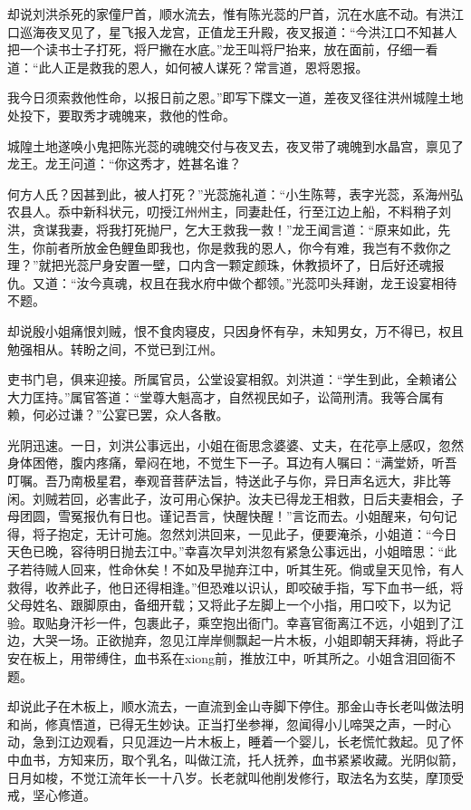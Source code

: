 \documentclass[12pt,UTF8]{ctexbook}
\begin{document}
{	却说刘洪杀死的家僮尸首，顺水流去，惟有陈光蕊的尸首，沉在水底不动。有洪江口巡海夜叉见了，星飞报入龙宫，正值龙王升殿，夜叉报道：“今洪江口不知甚人把一个读书士子打死，将尸撇在水底。”龙王叫将尸抬来，放在面前，仔细一看道：“此人正是救我的恩人，如何被人谋死？常言道，恩将恩报。
	
	我今日须索救他性命，以报日前之恩。”即写下牒文一道，差夜叉径往洪州城隍土地处投下，要取秀才魂魄来，救他的性命。
	
	城隍土地遂唤小鬼把陈光蕊的魂魄交付与夜叉去，夜叉带了魂魄到水晶宫，禀见了龙王。龙王问道：“你这秀才，姓甚名谁？
	
	何方人氏？因甚到此，被人打死？”光蕊施礼道：“小生陈萼，表字光蕊，系海州弘农县人。忝中新科状元，叨授江州州主，同妻赴任，行至江边上船，不料稍子刘洪，贪谋我妻，将我打死抛尸，乞大王救我一救！”龙王闻言道：“原来如此，先生，你前者所放金色鲤鱼即我也，你是救我的恩人，你今有难，我岂有不救你之理？”就把光蕊尸身安置一壁，口内含一颗定颜珠，休教损坏了，日后好还魂报仇。又道：“汝今真魂，权且在我水府中做个都领。”光蕊叩头拜谢，龙王设宴相待不题。
	
	却说殷小姐痛恨刘贼，恨不食肉寝皮，只因身怀有孕，未知男女，万不得已，权且勉强相从。转盼之间，不觉已到江州。
	
	吏书门皂，俱来迎接。所属官员，公堂设宴相叙。刘洪道：“学生到此，全赖诸公大力匡持。”属官答道：“堂尊大魁高才，自然视民如子，讼简刑清。我等合属有赖，何必过谦？”公宴已罢，众人各散。
	
	光阴迅速。一日，刘洪公事远出，小姐在衙思念婆婆、丈夫，在花亭上感叹，忽然身体困倦，腹内疼痛，晕闷在地，不觉生下一子。耳边有人嘱曰：“满堂娇，听吾叮嘱。吾乃南极星君，奉观音菩萨法旨，特送此子与你，异日声名远大，非比等闲。刘贼若回，必害此子，汝可用心保护。汝夫已得龙王相救，日后夫妻相会，子母团圆，雪冤报仇有日也。谨记吾言，快醒快醒！”言讫而去。小姐醒来，句句记得，将子抱定，无计可施。忽然刘洪回来，一见此子，便要淹杀，小姐道：“今日天色已晚，容待明日抛去江中。”幸喜次早刘洪忽有紧急公事远出，小姐暗思：“此子若待贼人回来，性命休矣！不如及早抛弃江中，听其生死。倘或皇天见怜，有人救得，收养此子，他日还得相逢。”但恐难以识认，即咬破手指，写下血书一纸，将父母姓名、跟脚原由，备细开载；又将此子左脚上一个小指，用口咬下，以为记验。取贴身汗衫一件，包裹此子，乘空抱出衙门。幸喜官衙离江不远，小姐到了江边，大哭一场。正欲抛弃，忽见江岸岸侧飘起一片木板，小姐即朝天拜祷，将此子安在板上，用带缚住，血书系在xiong前，推放江中，听其所之。小姐含泪回衙不题。
	
	却说此子在木板上，顺水流去，一直流到金山寺脚下停住。那金山寺长老叫做法明和尚，修真悟道，已得无生妙诀。正当打坐参禅，忽闻得小儿啼哭之声，一时心动，急到江边观看，只见涯边一片木板上，睡着一个婴儿，长老慌忙救起。见了怀中血书，方知来历，取个乳名，叫做江流，托人抚养，血书紧紧收藏。光阴似箭，日月如梭，不觉江流年长一十八岁。长老就叫他削发修行，取法名为玄奘，摩顶受戒，坚心修道。
	
}
\end{document}
